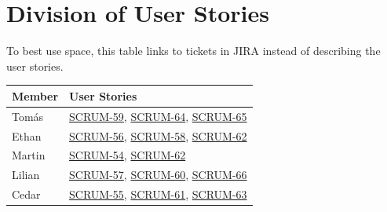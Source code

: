\section{Division of User Stories}

To best use space, this table links to tickets in JIRA instead of describing the user stories.
\vspace{0.2cm}

\begin{center}
\begin{tabular}{|l|l|}
\hline
\textbf{Member} & \textbf{User Stories} \\
\hline
Tomás & \href{https://unixusergroup.atlassian.net/browse/SCRUM-59}{SCRUM-59}, \href{https://unixusergroup.atlassian.net/browse/SCRUM-64}{SCRUM-64}, \href{https://unixusergroup.atlassian.net/browse/SCRUM-65}{SCRUM-65}\\
\hline
Ethan & \href{https://unixusergroup.atlassian.net/browse/SCRUM-56}{SCRUM-56}, \href{https://unixusergroup.atlassian.net/browse/SCRUM-58}{SCRUM-58}, \href{https://unixusergroup.atlassian.net/browse/SCRUM-62}{SCRUM-62} \\
\hline
Martin & \href{https://unixusergroup.atlassian.net/browse/SCRUM-54}{SCRUM-54}, \href{https://unixusergroup.atlassian.net/browse/SCRUM-62}{SCRUM-62} \\
\hline
Lilian & \href{https://unixusergroup.atlassian.net/browse/SCRUM-57}{SCRUM-57}, \href{https://unixusergroup.atlassian.net/browse/SCRUM-60}{SCRUM-60}, \href{https://unixusergroup.atlassian.net/browse/SCRUM-66}{SCRUM-66} \\
\hline
Cedar & \href{https://unixusergroup.atlassian.net/browse/SCRUM-55}{SCRUM-55}, \href{https://unixusergroup.atlassian.net/browse/SCRUM-61}{SCRUM-61}, \href{https://unixusergroup.atlassian.net/browse/SCRUM-63}{SCRUM-63} \\
\hline
\end{tabular}
\end{center}
